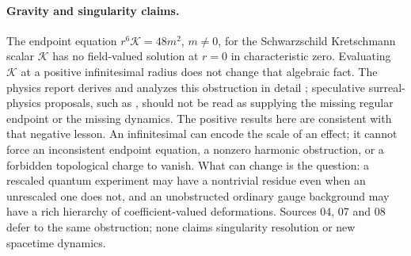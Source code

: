 \documentclass[11pt,oneside]{article}
\numberwithin{equation}{section}
\theoremstyle{plain}
\theoremstyle{definition}
\theoremstyle{remark}
\begin{document}
\paragraph{Gravity and singularity claims.}
The endpoint equation $r^6\mathcal K=48m^2$, $m\ne0$, for the Schwarzschild Kretschmann scalar $\mathcal K$ has no field-valued solution at $r=0$ in characteristic zero. Evaluating $\mathcal K$ at a positive infinitesimal radius does not change that algebraic fact. The physics report derives and analyzes this obstruction in detail \cite{repoPhysics}; speculative surreal-physics proposals, such as \cite{Nieto2016}, should not be read as supplying the missing regular endpoint or the missing dynamics. The positive results here are consistent with that negative lesson. An infinitesimal can encode the scale of an effect; it cannot force an inconsistent endpoint equation, a nonzero harmonic obstruction, or a forbidden topological charge to vanish. What can change is the question: a rescaled quantum experiment may have a nontrivial residue even when an unrescaled one does not, and an unobstructed ordinary gauge background may have a rich hierarchy of coefficient-valued deformations. Sources 04, 07 and 08 defer to the same obstruction; none claims singularity resolution or new spacetime dynamics.
\end{document}
